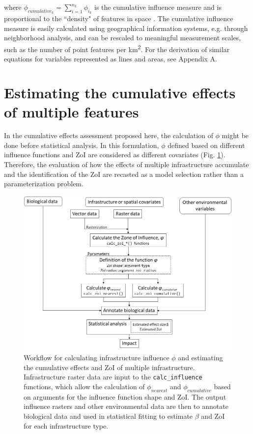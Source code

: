 \documentclass[titlepage]{article}
\begin{document}
where $\phi_{cumulative_k} = \sum_{i=1}^{n_k} \phi_{i_k}$ is the cumulative influence measure and is proportional to 
the ``density" of features in space \citep[e.g.][]{panzacchi_searching_2015}. The cumulative influence measure is easily calculated using geographical information systems, e.g. through neighborhood analysis, and can be rescaled to meaningful measurement scales, such as the number of point features per km\textsuperscript{2}. For the derivation of similar equations for variables represented as lines and areas, see Appendix A.

\section{Estimating the cumulative effects of multiple features}

In the cumulative effects assessment proposed here, the calculation of $\phi$ might be done before statistical analysis. In this formulation, $\phi$ defined based on different influence functions and ZoI are considered as different covariates (Fig. \ref{fig:workflow}). Therefore, the evaluation of how the effects of multiple infrastructure accumulate and the identification of the ZoI are recasted as a model selection rather than a parameterization problem.

\begin{figure}[h]
\centering
\includegraphics[width=1.3\textwidth,center]{figures/figure_workflow.png}
\caption{\label{fig:workflow} Workflow for calculating infrastructure influence $\phi$ and estimating the cumulative effects and ZoI of multiple infrastructure. Infrastructure raster data are input to the \texttt{calc\_influence} functions, which allow the calculation 
of $\phi_{nearest}$ and $\phi_{cumulative}$ based on arguments for the influence function shape and ZoI. The output influence rasters and other environmental data are then to annotate biological data and used in statistical fitting to estimate $\beta$ and ZoI for each infrastructure type.}
\end{figure}
\end{document}

